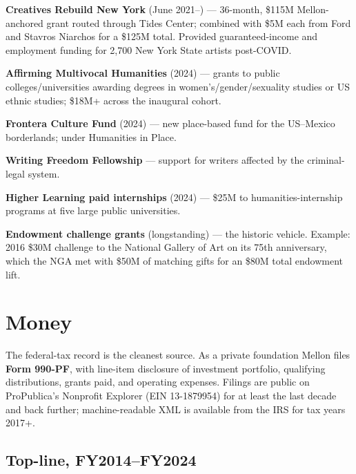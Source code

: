 \documentclass[10pt,letterpaper,twocolumn]{article}
\begin{document}
\textbf{Creatives Rebuild New York} (June 2021--) --- 36-month, \$115M Mellon-anchored grant routed through Tides Center; combined with \$5M each from Ford and Stavros Niarchos for a \$125M total. Provided guaranteed-income and employment funding for 2,700 New York State artists post-COVID.~\citep{crnymellon}

\textbf{Affirming Multivocal Humanities} (2024) --- grants to public colleges/universities awarding degrees in women's/gender/sexuality studies or US ethnic studies; \$18M+ across the inaugural cohort.

\textbf{Frontera Culture Fund} (2024) --- new place-based fund for the US--Mexico borderlands; under Humanities in Place.

\textbf{Writing Freedom Fellowship} --- support for writers affected by the criminal-legal system.

\textbf{Higher Learning paid internships} (2024) --- \$25M to humanities-internship programs at five large public universities.

\textbf{Endowment challenge grants} (longstanding) --- the historic vehicle. Example: 2016 \$30M challenge to the National Gallery of Art on its 75th anniversary, which the NGA met with \$50M of matching gifts for an \$80M total endowment lift.~\citep{ngamellon2021}

\section{Money}\label{sec:money}

The federal-tax record is the cleanest source. As a private foundation Mellon files \textbf{Form 990-PF}, with line-item disclosure of investment portfolio, qualifying distributions, grants paid, and operating expenses. Filings are public on ProPublica's Nonprofit Explorer (EIN 13-1879954) for at least the last decade and back further; machine-readable XML is available from the IRS for tax years 2017+.

\subsection{Top-line, FY2014--FY2024}
\end{document}
